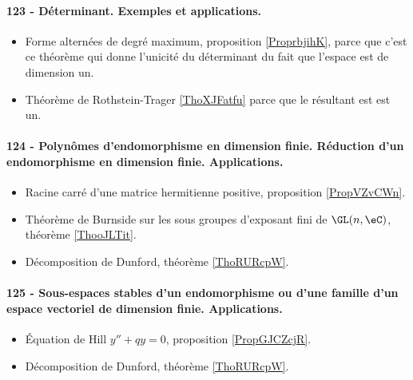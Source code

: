 \paragraph{123 - Déterminant. Exemples et applications.}
\begin{itemize}
    \item Forme alternées de degré maximum, proposition \ref{ProprbjihK}, parce que c'est ce théorème qui donne l'unicité du déterminant du fait que l'espace est de dimension un.
    \item Théorème de Rothstein-Trager \ref{ThoXJFatfu} parce que le résultant est est un.
\end{itemize}
\paragraph{124 - Polynômes d’endomorphisme en dimension finie. Réduction d’un endomorphisme en dimension finie. Applications.}
\begin{itemize}
    \item Racine carré d'une matrice hermitienne positive, proposition \ref{PropVZvCWn}.
    \item Théorème de Burnside sur les sous groupes d'exposant fini de \( \GL(n,\eC)\), théorème \ref{ThooJLTit}.
    \item Décomposition de Dunford, théorème \ref{ThoRURcpW}. 
\end{itemize}
\paragraph{125 - Sous-espaces stables d’un endomorphisme ou d'une famille d’un espace vectoriel de dimension finie. Applications.}
\begin{itemize}
    \item Équation de Hill \( y''+qy=0\), proposition \ref{PropGJCZcjR}.
    \item Décomposition de Dunford, théorème \ref{ThoRURcpW}. 
\end{itemize}
